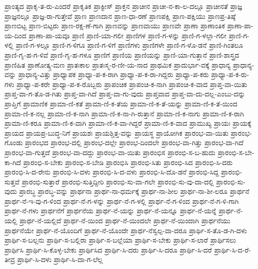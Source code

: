 {ಪ್ರಾಂತ್ಯದ
ಪ್ರಾಕೃ-ತ-ರು-ಎಂದರೆ
ಪ್ರಾಕೃತಿಕ
ಪ್ರಾಕ್ಟೀಸ್
ಪ್ರಾಕ್ತನ
ಪ್ರಾಚೀನ
ಪ್ರಾಚೀ-ನ-ಕಾ-ಲ-ದಲ್ಲೂ
ಪ್ರಾಚೀನತೆ
ಪ್ರಾಜ್ಞ
ಪ್ರಾಜ್ಞನಲ್ಲೂ
ಪ್ರಾಜ್ಞ-ರಾ-ಗುತ್ತೇವೆ
ಪ್ರಾಣ
ಪ್ರಾಣದಾನ
ಪ್ರಾಣ-ಧಾ-ರಣೆ
ಪ್ರಾಣಪಕ್ಷಿ
ಪ್ರಾಣ-ಪಕ್ಷಿಯು
ಪ್ರಾಣಪ್ರ-ತಿಷ್ಠೆ
ಪ್ರಾಣಬಿಟ್ಟ
ಪ್ರಾಣ-ಬಿಟ್ಟರು
ಪ್ರಾಣ-ರಕ್ಷ-ಣೆ-ಗಾಗಿ
ಪ್ರಾಣವನ್ನು
ಪ್ರಾಣವಾಯು
ಪ್ರಾಣವೇ
ಪ್ರಾಣಾ
ಪ್ರಾಣಾಂತಿಕ
ಪ್ರಾಣಾ-ಪಾ-ಯ-ದಿಂದ
ಪ್ರಾಣಾ-ಪಾ-ಯವೂ
ಪ್ರಾಣಿ
ಪ್ರಾಣಿ-ಯಾ-ಗಲೀ
ಪ್ರಾಣಿಗಳ
ಪ್ರಾಣಿ-ಗ-ಳನ್ನು
ಪ್ರಾಣಿ-ಗ-ಳಲ್ಲಾ-ಗಲೀ
ಪ್ರಾಣಿ-ಗ-ಳಲ್ಲಿ
ಪ್ರಾಣಿ-ಗ-ಳಲ್ಲೂ
ಪ್ರಾಣಿ-ಗ-ಳಿಗೂ
ಪ್ರಾಣಿ-ಗ-ಳಿಗೆ
ಪ್ರಾಣಿಗಳು
ಪ್ರಾಣಿಗಳೇ
ಪ್ರಾಣಿ-ಗ-ಳೊ-ಡನೆ
ಪ್ರಾಣಿ-ಗಿಂತಲೂ
ಪ್ರಾಣಿ-ಗೃ-ಹ-ಗ-ಳಿವೆ
ಪ್ರಾಣಿ-ಗೃ-ಹ-ಗಳೂ
ಪ್ರಾಣಿಗೆ
ಪ್ರಾಣಿಯ
ಪ್ರಾಣಿಯನ್ನು
ಪ್ರಾಣಿ-ಯಾ-ಗುತ್ತಾನೆ
ಪ್ರಾಣಿ-ಶಾಸ್ತ್ರದ
ಪ್ರಾಣಿಹಿತ
ಪ್ರಾಣೋತ್ಕ್ರ-ಮಣ
ಪ್ರಾತಃಕಾಲ
ಪ್ರಾತಃಸ್ಮ-ರ-ಣೀ-ಯ-ನಾದ
ಪ್ರಾಥಮಿಕ
ಪ್ರಾದುರ್ಭಾ-ವಕ್ಕೆ
ಪ್ರಾಧಾನ್ಯ
ಪ್ರಾಧಾನ್ಯ-ವನ್ನು
ಪ್ರಾಧಾನ್ಯ-ವಿತ್ತು
ಪ್ರಾಧ್ಯಾಪಕ
ಪ್ರಾಧ್ಯಾ-ಪ-ಕ-ರಾಗಿ
ಪ್ರಾಧ್ಯಾ-ಪ-ಕ-ರಾ-ಗಿದ್ದರು
ಪ್ರಾಧ್ಯಾ-ಪ-ಕರು
ಪ್ರಾಧ್ಯಾ-ಪ-ಕ-ರು-ಗಳು
ಪ್ರಾಧ್ಯಾ-ಪ-ಕರೇ
ಪ್ರಾಧ್ಯಾ-ಪ-ಕ-ರೊಬ್ಬರು
ಪ್ರಾಪಂಚಿಕ
ಪ್ರಾಪಂಚಿ-ಕ-ನಾಗಿ
ಪ್ರಾಪಂಚಿ-ಕ-ವಾದ
ಪ್ರಾಪ್ತ-ವಾ-ಯಿತು
ಪ್ರಾಪ್ತ-ವಾ-ಗ-ತೊ-ಡ-ಗಿತು
ಪ್ರಾಪ್ತ-ವಾ-ಗಿದೆ
ಪ್ರಾಪ್ತ-ವಾ-ಗು-ವುದು
ಪ್ರಾಪ್ತವಾದ
ಪ್ರಾಪ್ತ-ವಾ-ದು-ದಲ್ಲ-ಎಂಬು-ದನ್ನು
ಪ್ರಾಪ್ತಿಗೆ
ಪ್ರಾಮಾಣಿಕ
ಪ್ರಾಮಾ-ಣಿ-ಕತೆ
ಪ್ರಾಮಾ-ಣಿ-ಕ-ತೆಯ
ಪ್ರಾಮಾ-ಣಿ-ಕ-ತೆ-ಯನ್ನು
ಪ್ರಾಮಾ-ಣಿ-ಕ-ತೆ-ಯಿಂದ
ಪ್ರಾಮಾ-ಣಿ-ಕ-ನಲ್ಲ
ಪ್ರಾಮಾ-ಣಿ-ಕ-ನಾಗಿ
ಪ್ರಾಮಾ-ಣಿ-ಕ-ನಾ-ಗಿ-ರುತ್ತಾನೆ
ಪ್ರಾಮಾ-ಣಿ-ಕ-ನಾಗು
ಪ್ರಾಮಾ-ಣಿ-ಕ-ರಾಗಿ
ಪ್ರಾಮಾ-ಣಿ-ಕರೂ
ಪ್ರಾಮಾ-ಣಿ-ಕ-ವಾಗಿ
ಪ್ರಾಮಾ-ಣಿ-ಕ-ವಾ-ಗಿದ್ದರೆ
ಪ್ರಾಮಾ-ಣಿ-ಕ-ವಾದ
ಪ್ರಾಮುಖ್ಯ
ಪ್ರಾಯಃ
ಪ್ರಾಯಕ್ಕೆ
ಪ್ರಾಯದ
ಪ್ರಾಯಪ್ರ-ಬುದ್ಧ-ನಿಗೆ
ಪ್ರಾಯಶಃ
ಪ್ರಾಯಶ್ಚಿತ್ತ-ವನ್ನು
ಪ್ರಾಯಸ್ಥ
ಪ್ರಾಯೋಗಿಕ
ಪ್ರಾರಂಭ-ವಾ-ಯಿತು
ಪ್ರಾರಂಭ-ಗೊಂಡು
ಪ್ರಾರಂಭದ
ಪ್ರಾರಂಭ-ದಲ್ಲಿ
ಪ್ರಾರಂಭ-ದಲ್ಲೇ
ಪ್ರಾರಂಭ-ದಿಂದಲೇ
ಪ್ರಾರಂಭ-ವಾ-ಗಿತ್ತು
ಪ್ರಾರಂಭ-ವಾ-ಗಿದೆ
ಪ್ರಾರಂಭ-ವಾ-ಗುತ್ತದೆ
ಪ್ರಾರಂಭ-ವಾ-ದದ್ದು
ಪ್ರಾರಂಭ-ವಾ-ಯಿತು
ಪ್ರಾರಂಭಿಸ
ಪ್ರಾರಂಭಿ-ಸ-ಬ-ಹುದು
ಪ್ರಾರಂಭಿ-ಸ-ಬೇ-ಕಾ-ಗಿದೆ
ಪ್ರಾರಂಭಿ-ಸ-ಬೇಕು
ಪ್ರಾರಂಭಿ-ಸ-ಬೇಡಿ
ಪ್ರಾರಂಭಿಸಿ
ಪ್ರಾರಂಭಿ-ಸಿತು
ಪ್ರಾರಂಭಿ-ಸಿದ
ಪ್ರಾರಂಭಿ-ಸಿ-ದರು
ಪ್ರಾರಂಭಿ-ಸಿ-ದ-ರೇನು
ಪ್ರಾರಂಭಿ-ಸಿ-ದಳು
ಪ್ರಾರಂಭಿ-ಸಿ-ದ-ವಳು
ಪ್ರಾರಂಭಿ-ಸಿ-ದೊ-ಡನೆ
ಪ್ರಾರಂಭಿ-ಸಿದ್ದ
ಪ್ರಾರಂಭಿ-ಸುತ್ತವೆ
ಪ್ರಾರಂಭಿ-ಸುತ್ತಾರೆ
ಪ್ರಾರಂಭಿ-ಸುತ್ತಿದ್ದೀರಿ
ಪ್ರಾರಂಭಿ-ಸು-ವಾ-ಗಲೇ
ಪ್ರಾರಂಭಿ-ಸು-ವು-ದಾ-ದಲ್ಲಿ
ಪ್ರಾರಂಭಿ-ಸು-ವುದು
ಪ್ರಾರಬ್ಧ
ಪ್ರಾರಬ್ಧ-ವನ್ನು
ಪ್ರಾರ್ಥನಾ
ಪ್ರಾರ್ಥ-ನಾ-ಧರ್ಮಕ್ಕೆ
ಪ್ರಾರ್ಥ-ನಾ-ಶೀಲ
ಪ್ರಾರ್ಥ-ನಾ-ಶೀ-ಲರೂ
ಪ್ರಾರ್ಥನೆ
ಪ್ರಾರ್ಥ-ನೆ-ಇ-ವು-ಗ-ಳಿಂದ
ಪ್ರಾರ್ಥ-ನೆ-ಗ-ಳನ್ನು
ಪ್ರಾರ್ಥ-ನೆ-ಗ-ಳಲ್ಲಿ
ಪ್ರಾರ್ಥ-ನೆ-ಗ-ಳಿಂದ
ಪ್ರಾರ್ಥ-ನೆ-ಗ-ಳಿ-ಗಾಗಿ
ಪ್ರಾರ್ಥ-ನೆ-ಗಳು
ಪ್ರಾರ್ಥನೆಗೆ
ಪ್ರಾರ್ಥನೆಯ
ಪ್ರಾರ್ಥ-ನೆ-ಯನ್ನು
ಪ್ರಾರ್ಥ-ನೆ-ಯನ್ನೂ
ಪ್ರಾರ್ಥ-ನೆ-ಯನ್ನೆ
ಪ್ರಾರ್ಥ-ನೆ-ಯಲ್ಲಿ
ಪ್ರಾರ್ಥ-ನೆ-ಯಲ್ಲಿದೆ
ಪ್ರಾರ್ಥ-ನೆ-ಯಿಂದ
ಪ್ರಾರ್ಥ-ನೆ-ಯಿಂದಲೇ
ಪ್ರಾರ್ಥ-ನೆ-ಯಿಂದಾಗಿ
ಪ್ರಾರ್ಥನೆಯು
ಪ್ರಾರ್ಥನೆಯೇ
ಪ್ರಾರ್ಥ-ನೆ-ಯೊಂದಿಗೆ
ಪ್ರಾರ್ಥ-ನೆ-ಯೊಂದೇ
ಪ್ರಾರ್ಥ-ನೆಸ್ವಲ್ಪ-ವಾ-ದರೂ
ಪ್ರಾರ್ಥಿ-ಸ-ತೊ-ಡ-ಗಿ-ದಳು
ಪ್ರಾರ್ಥಿ-ಸ-ಬಲ್ಲನು
ಪ್ರಾರ್ಥಿ-ಸ-ಬಲ್ಲಿರಾ
ಪ್ರಾರ್ಥಿ-ಸ-ಬಲ್ಲೆಯಾ
ಪ್ರಾರ್ಥಿ-ಸ-ಬೇಕು
ಪ್ರಾರ್ಥಿ-ಸ-ಲಾರೆ
ಪ್ರಾರ್ಥಿಸಲು
ಪ್ರಾರ್ಥಿಸಿ
ಪ್ರಾರ್ಥಿ-ಸಿ-ಕೊಳ್ಳ-ಬೇಕು
ಪ್ರಾರ್ಥಿಸಿದ
ಪ್ರಾರ್ಥಿ-ಸಿ-ದರು
ಪ್ರಾರ್ಥಿ-ಸಿ-ದರೂ
ಪ್ರಾರ್ಥಿ-ಸಿ-ದರೆ
ಪ್ರಾರ್ಥಿ-ಸಿ-ದ-ರೆ-ತೀವ್ರ
ಪ್ರಾರ್ಥಿ-ಸಿ-ದಳು
ಪ್ರಾರ್ಥಿ-ಸಿ-ದಾ-ಗ-ಲೆಲ್ಲ
}
